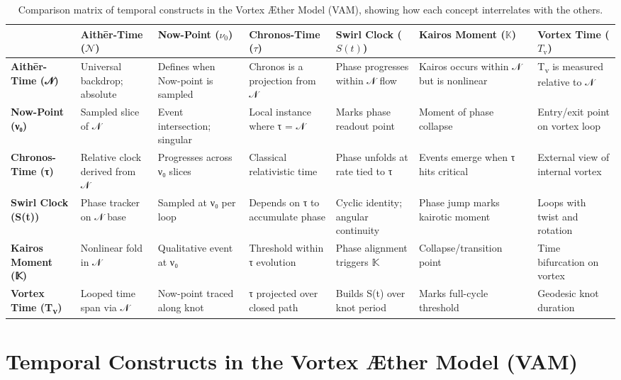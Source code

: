 \documentclass[12pt]{article}
\begin{document}
    \begin{table}
        \centering
        \scriptsize
        \begin{tabular}{|l|l|l|l|l|l|l|}
            \hline
            \textbf{} & \textbf{Aithēr-Time} (\(\mathcal{N}\)) & \textbf{Now-Point} (\(\nu_0\)) & \textbf{Chronos-Time} (\(\tau\)) & \textbf{Swirl Clock} (\(S(t)\)) & \textbf{Kairos Moment} (\(\mathbb{K}\)) & \textbf{Vortex Time} (\(T_\text{v}\)) \\
            \hline
            \textbf{Aithēr-Time (𝒩)} & Universal backdrop; absolute & Defines when Now-point is sampled & Chronos is a projection from 𝒩 & Phase progresses within 𝒩 flow & Kairos occurs within 𝒩 but is nonlinear & T\textsubscript{v} is measured relative to 𝒩 \\
            \hline
            \textbf{Now-Point (ν₀)} & Sampled slice of 𝒩 & Event intersection; singular & Local instance where τ = 𝒩 & Marks phase readout point & Moment of phase collapse & Entry/exit point on vortex loop \\
            \hline
            \textbf{Chronos-Time (τ)} & Relative clock derived from 𝒩 & Progresses across ν₀ slices & Classical relativistic time & Phase unfolds at rate tied to τ & Events emerge when τ hits critical & External view of internal vortex \\
            \hline
            \textbf{Swirl Clock (S(t))} & Phase tracker on 𝒩 base & Sampled at ν₀ per loop & Depends on τ to accumulate phase & Cyclic identity; angular continuity & Phase jump marks kairotic moment & Loops with twist and rotation \\
            \hline
            \textbf{Kairos Moment (𝕂)} & Nonlinear fold in 𝒩 & Qualitative event at ν₀ & Threshold within τ evolution & Phase alignment triggers 𝕂 & Collapse/transition point & Time bifurcation on vortex \\
            \hline
            \textbf{Vortex Time (T\textsubscript{v})} & Looped time span via 𝒩 & Now-point traced along knot & τ projected over closed path & Builds S(t) over knot period & Marks full-cycle threshold & Geodesic knot duration \\
            \hline
        \end{tabular}
        \caption{Comparison matrix of temporal constructs in the Vortex Æther Model (VAM), showing how each concept interrelates with the others.}
    \end{table}
    \section*{Temporal Constructs in the Vortex Æther Model (VAM)}
\end{document}
